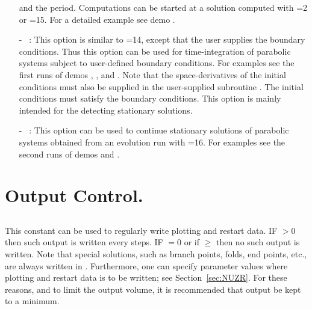 \begin{itemize}
  and the period. 
  Computations can be started at a solution computed with =2
  or =15.
  For a detailed example see demo .
\item[-] ~:
  This option is similar to =14, except that the user supplies the
  boundary conditions. Thus this option can be used for 
  time-integration of parabolic systems subject to 
  user-defined boundary conditions. For examples see the first runs
  of demos , , and . Note that
  the space-derivatives of the initial conditions must
  also be supplied in the user-supplied subroutine . 
  The initial conditions must satisfy the boundary conditions.
  This option is mainly intended for the detecting stationary solutions.
 \item[-] ~: 
  This option can be used to continue stationary solutions
  of parabolic systems obtained from an evolution run with =16.
  For examples see the second runs of demos  and .
\end{itemize}


\section{ Output Control.} \label{sec:Output_control}
\subsection{}  \label{sec:NPR}


 This constant can be used to regularly write  plotting and restart 
 data.  
 IF $>$0 then such output is written every  steps.
 IF $=$0 or if $\ge$ then no such output is written.
 Note that special solutions, such as branch points, folds, end points, etc., 
 are always written in .
 Furthermore, one can specify parameter values where plotting and restart 
 data is to be written; see Section~\ref{sec:NUZR}.
 For these reasons, and to limit the output volume, it is recommended that
  output be kept to a minimum.

